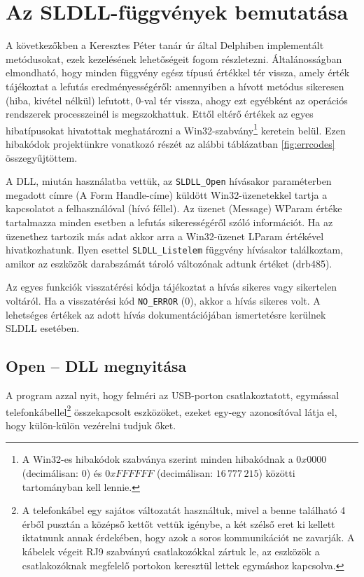\documentclass[tocnopagenum]{thesis-ekf}
\begin{document}
	\section{Az SLDLL-függvények bemutatása}
	A következőkben a Keresztes Péter tanár úr által Delphiben implementált metódusokat, ezek kezelésének lehetőségeit fogom részletezni.
	Általánosságban elmondható, hogy minden függvény egész típusú értékkel tér vissza, amely érték tájékoztat a lefutás eredményességéről: amennyiben a hívott metódus sikeresen (hiba, kivétel nélkül) lefutott, 0-val tér vissza, ahogy ezt egyébként az operációs rendszerek processzeinél is megszokhattuk. Ettől eltérő értékek az egyes hibatípusokat hivatottak meghatározni a Win32-szabvány\footnote{A Win32-es hibakódok szabványa szerint minden hibakódnak a $0x0000$ (decimálisan: 0) és $0xFFFFFF$ (decimálisan: $16\,777\,215$) közötti tartományban kell lennie.} keretein belül. Ezen hibakódok projektünkre vonatkozó részét az alábbi táblázatban \ref{fig:errcodes} összegyűjtöttem. \cite{errcodes}
	
	A DLL, miután használatba vettük, az \verb*|SLDLL_Open| hívásakor paraméterben megadott címre (A Form Handle-címe) küldött	Win32-üzenetekkel tartja a kapcsolatot a felhasználóval (hívó féllel). Az üzenet (Message) WParam értéke tartalmazza minden esetben a lefutás sikerességéről szóló információt.
	Ha az üzenethez tartozik más adat akkor arra a Win32-üzenet LParam értékével hivatkozhatunk. Ilyen esettel \verb*|SLDLL_Listelem| függvény hívásakor találkoztam, amikor az eszközök darabszámát tároló változónak adtunk értéket (drb485).
	
	Az egyes funkciók visszatérési kódja tájékoztat a hívás sikeres vagy sikertelen voltáról. Ha a visszatérési kód \verb*|NO_ERROR| (0), akkor a hívás sikeres volt. A lehetséges értékek az adott hívás dokumentációjában ismertetésre kerülnek SLDLL esetében.
	
	\subsection{Open -- DLL megnyitása}
	A program azzal nyit, hogy felméri az USB-porton csatlakoztatott, egymással telefonkábellel\footnote{A telefonkábel egy sajátos változatát használtuk, mivel a benne található 4 érből pusztán a középső kettőt vettük igénybe, a két szélső eret ki kellett iktatnunk annak érdekében, hogy azok a soros kommunikációt ne zavarják. A kábelek végeit RJ9 szabványú csatlakozókkal zártuk le, az eszközök a csatlakozóknak megfelelő portokon keresztül lettek egymáshoz kapcsolva.} összekapcsolt eszközöket, ezeket egy-egy azonosítóval látja el, hogy külön-külön vezérelni tudjuk őket. 
		
\end{document}
